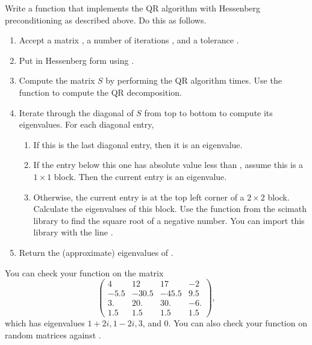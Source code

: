 \begin{problem}
Write a function that implements the QR algorithm with Hessenberg preconditioning as described above.
Do this as follows.
\begin{enumerate}
\item Accept a matrix , a number of iterations , and a tolerance .
\item Put  in Hessenberg form using .
\item Compute the matrix $S$ by performing the QR algorithm  times.
Use the function  to compute the QR decomposition.
\item Iterate through the diagonal of $S$ from top to bottom to compute its eigenvalues.
For each diagonal entry,
\begin{enumerate}
\item If this is the last diagonal entry, then it is an eigenvalue.
\item If the entry below this one has absolute value less than , assume this is a $1\times 1$ block.
Then the current entry is an eigenvalue.
\item Otherwise, the current entry is at the top left corner of a $2 \times 2$ block.
Calculate the eigenvalues of this block.
Use the  function from the scimath library to find the square root of a negative number.
You can import this library with the line .
\end{enumerate}
\item Return the (approximate) eigenvalues of .
\end{enumerate}
You can check your function on the matrix
\[
\begin{pmatrix}
 4 &  12 & 17 &  -2 \\
-5.5& -30.5 & -45.5 &  9.5\\
 3. &  20. & 30. &  -6. \\
1.5 &  1.5&   1.5&   1.5
       \end{pmatrix},
\]
which has eigenvalues $1+2i, 1-2i, 3$, and 0. You can also check your function on random matrices against .
\label{prob:qr_solver}
\end{problem}

